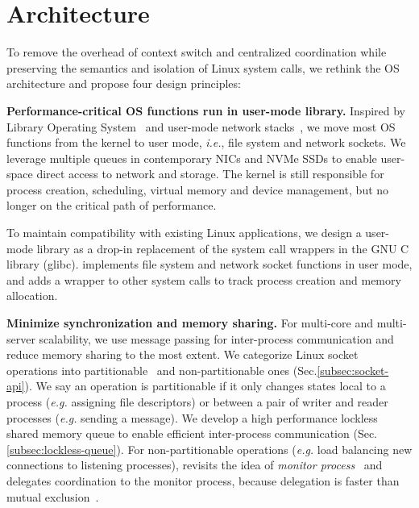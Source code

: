 \section{Architecture}
\label{sec:architecture}

To remove the overhead of context switch and centralized coordination while preserving the semantics and isolation of Linux system calls, we rethink the OS architecture and propose four design principles:

\textbf{Performance-critical OS functions run in user-mode library.}
Inspired by Library Operating System~ and user-mode network stacks~, we move most OS functions from the kernel to user mode, \textit{i.e.}, file system and network sockets. We leverage multiple queues in contemporary NICs and NVMe SSDs to enable user-space direct access to network and storage. The kernel is still responsible for process creation, scheduling, virtual memory and device management, but no longer on the critical path of performance.

To maintain compatibility with existing Linux applications, we design a user-mode library \libipc as a drop-in replacement of the system call wrappers in the GNU C library (glibc). \libipc implements file system and network socket functions in user mode, and adds a wrapper to other system calls to track process creation and memory allocation.

\textbf{Minimize synchronization and memory sharing.}
For multi-core and multi-server scalability, we use message passing for inter-process communication and reduce memory sharing to the most extent. We categorize Linux socket operations into partitionable~\cite{partitionable} and non-partitionable ones (Sec.\ref{subsec:socket-api}). We say an operation is partitionable if it only changes states local to a process (\textit{e.g.} assigning file descriptors) or between a pair of writer and reader processes (\textit{e.g.} sending a message). We develop a high performance lockless shared memory queue to enable efficient inter-process communication (Sec.\ref{subsec:lockless-queue}). For non-partitionable operations (\textit{e.g.} load balancing new connections to listening processes), \libipc revisits the idea of \textit{monitor process}~\cite{hoare1974monitors} and delegates coordination to the monitor process, because delegation is faster than mutual exclusion~\cite{roghanchi2017ffwd}.


